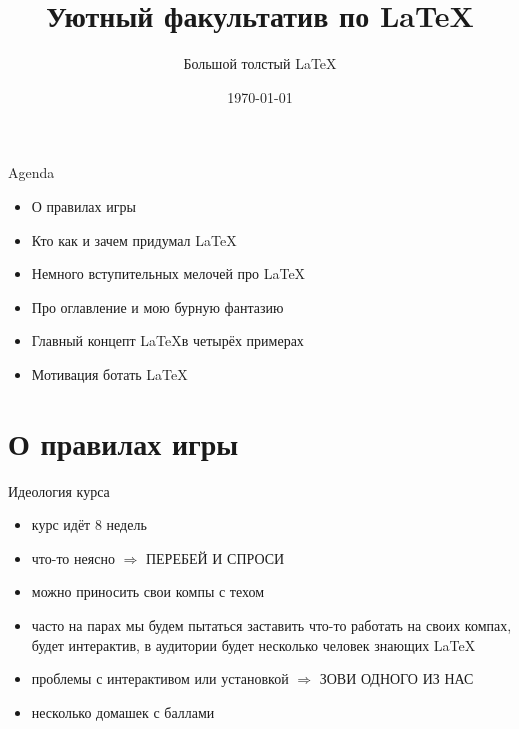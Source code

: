 \documentclass[aspectratio=169,newPxFont]{beamer}
\title{Уютный факультатив по \LaTeX}
\subtitle{Большой толстый \LaTeX}
\date{\today}
\begin{document}
\begingroup
{}
\begin{frame}[plain]
\begin{center}
\Huge{\color{red}{ВНИМАНИЕ!}}
\end{center}

\begin{center}
\end{center}
\end{frame}
\endgroup

 \maketitle
 
\begin{frame}{Agenda}
\begin{itemize}
	\item О правилах игры 
	\item Кто как и зачем придумал \LaTeX
	\item Немного вступительных мелочей про \LaTeX
	\item Про оглавление и мою бурную фантазию 
	\item Главный концепт  \LaTeX в четырёх примерах
	\item Мотивация ботать \LaTeX
\end{itemize}
\end{frame}


\section{О правилах игры}


\begin{frame}{Идеология курса}
\begin{itemize}
\item курс идёт 8 недель
\item что-то неясно $\Rightarrow$ \alert{ ПЕРЕБЕЙ И СПРОСИ}
\item можно приносить свои компы с техом
\item часто на парах мы будем пытаться заставить что-то работать на своих компах, будет интерактив, в аудитории будет несколько человек знающих \LaTeX
\item проблемы с интерактивом или установкой  $\Rightarrow$ \alert{ЗОВИ ОДНОГО ИЗ НАС} 
\item несколько домашек с баллами
\end{itemize}
\end{frame}
\end{document}
